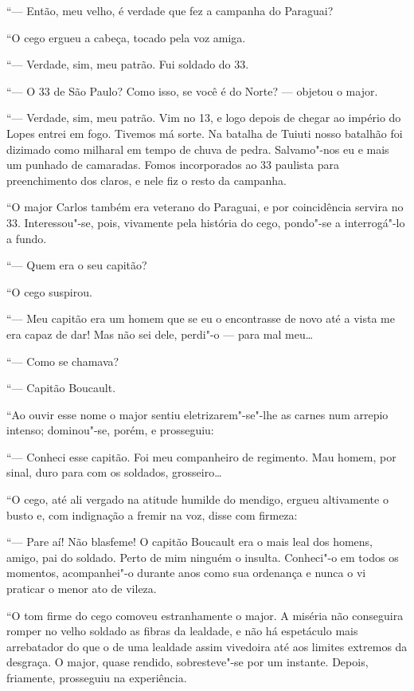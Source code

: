 ``--- Então, meu velho, é verdade que fez a campanha do Paraguai?

``O cego ergueu a cabeça, tocado pela voz amiga.

``--- Verdade, sim, meu patrão. Fui soldado do 33.

``--- O 33 de São Paulo? Como isso, se você é do Norte? --- objetou o
major.

``--- Verdade, sim, meu patrão. Vim no 13, e logo depois de chegar ao
império do Lopes entrei em fogo. Tivemos má sorte. Na batalha de Tuiuti
nosso batalhão foi dizimado como milharal em tempo de chuva de pedra.
Salvamo"-nos eu e mais um punhado de camaradas. Fomos incorporados ao 33
paulista para preenchimento dos claros, e nele fiz o resto da campanha.

``O major Carlos também era veterano do Paraguai, e por coincidência
servira no 33. Interessou"-se, pois, vivamente pela história do cego,
pondo"-se a interrogá"-lo a fundo.

``--- Quem era o seu capitão?

``O cego suspirou.

``--- Meu capitão era um homem que se eu o encontrasse de novo até a
vista me era capaz de dar! Mas não sei dele, perdi"-o --- para mal meu\ldots{}

``--- Como se chamava?

``--- Capitão Boucault.

``Ao ouvir esse nome o major sentiu eletrizarem"-se"-lhe as carnes num
arrepio intenso; dominou"-se, porém, e prosseguiu:

``--- Conheci esse capitão. Foi meu companheiro de regimento. Mau homem,
por sinal, duro para com os soldados, grosseiro\ldots{}

``O cego, até ali vergado na atitude humilde do mendigo, ergueu
altivamente o busto e, com indignação a fremir na voz, disse com
firmeza:

``--- Pare aí! Não blasfeme! O capitão Boucault era o mais leal dos
homens, amigo, pai do soldado. Perto de mim ninguém o insulta. Conheci"-o
em todos os momentos, acompanhei"-o durante anos como sua ordenança e
nunca o vi praticar o menor ato de vileza.

``O tom firme do cego comoveu estranhamente o major. A miséria não
conseguira romper no velho soldado as fibras da lealdade, e não há
espetáculo mais arrebatador do que o de uma lealdade assim vivedoira até
aos limites extremos da desgraça. O major, quase rendido, sobresteve"-se
por um instante. Depois, friamente, prosseguiu na experiência.

